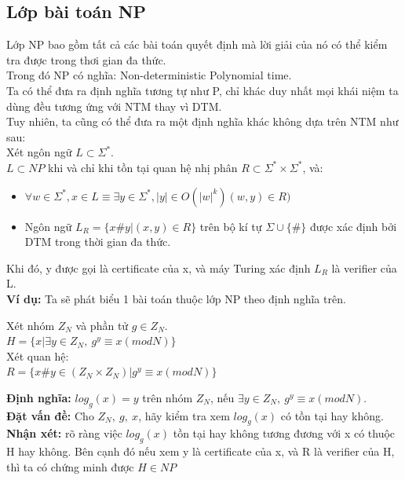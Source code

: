 \documentclass[a4paper 14pt]{article}
\begin{document}
		\subsection{Lớp bài toán NP}
			Lớp NP bao gồm tất cả các bài toán quyết định mà lời giải của nó có thể kiểm tra được trong thơi gian đa thức.\\
			Trong đó NP có nghĩa: Non-deterministic Polynomial time.\\
			Ta có thể đưa ra định nghĩa tương tự như P, chỉ khác duy nhất mọi khái niệm ta dùng đều tương ứng với NTM thay vì DTM.\\
			Tuy nhiên, ta cũng có thể đưa ra một định nghĩa khác không dựa trên NTM như sau:\\
			Xét ngôn ngữ $L \subset \Sigma^{*}$.\\
			$L \subset NP$ khi và chỉ khi tồn tại quan hệ nhị phân $R \subset \Sigma^{*} \times \Sigma^{*}$, và:
			\begin{itemize}
				\item $\forall w \in \Sigma^{*}, x \in L \equiv \exists y \in \Sigma^{*}, |y| \in O(|w|^k) (w,y) \in R)$
				\item Ngôn ngữ $L_R = \{x\#y| (x,y) \in R\}$ trên bộ kí tự $\Sigma \cup \{\#\}$ được xác định bởi DTM trong thời gian đa thức.
			\end{itemize}
			Khi đó, y được gọi là certificate của x, và máy Turing xác định $L_R$ là verifier của L.\\
			\vspace{0.5cm}
			\textbf{Ví dụ:}
			Ta sẽ phát biểu 1 bài toán thuộc lớp NP theo định nghĩa trên.\\
			\begin{adjustwidth}{1cm}{}
				Xét nhóm $Z_N$ và phần tử  $g \in Z_N$. \\
				$H = \{x | \exists y \in Z_N,~ g^y \equiv x (mod N)\}$\\
				Xét quan hệ:\\
				$R = \{x\#y \in (Z_N\times Z_N)| g^y \equiv x (mod N)\}$\\
			
			\end{adjustwidth}
			\textbf{Định nghĩa:} $log_g(x) = y$ trên nhóm $Z_N$, nếu  $\exists y \in Z_N,~ g^y \equiv x (mod N)$.\\
			\textbf{Đặt vấn đề:} Cho $Z_N,~g,~x$, hãy kiểm tra xem $log_g(x)$ có tồn tại hay không.\\
			\textbf{Nhận xét:} rõ ràng việc $log_g(x)$ tồn tại hay không tương đương với x có thuộc H hay không. Bên cạnh đó nếu xem y là certificate của x, và R là verifier của H, thì ta có chứng minh được $H \in NP$\\
			
\end{document}
